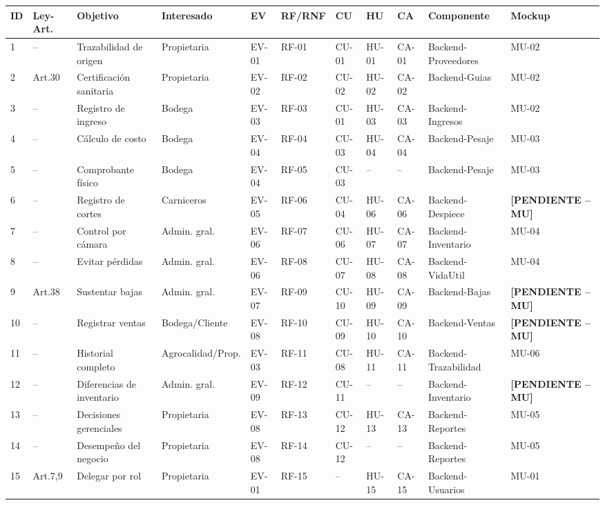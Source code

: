 \documentclass[11pt,a4paper]{article}
\newcommand{\PENDIENTE}[1]{\textcolor{pendiente}{\textbf{[PENDIENTE -- #1]}}}
\begin{document}
\footnotesize
\begin{longtable}{|p{0.6cm}|p{1.6cm}|p{2.3cm}|p{1.7cm}|p{0.9cm}|p{0.9cm}|p{0.9cm}|p{0.9cm}|p{0.9cm}|p{1.5cm}|p{1.1cm}|}
\hline
\textbf{ID} & \textbf{Ley-Art.} & \textbf{Objetivo} & \textbf{Interesado} & \textbf{EV} & \textbf{RF/RNF} & \textbf{CU} & \textbf{HU} & \textbf{CA} & \textbf{Componente} & \textbf{Mockup} \\
\hline
1 & -- & Trazabilidad de origen & Propietaria & EV-01 & RF-01 & CU-01 & HU-01 & CA-01 & Backend-Proveedores & MU-02 \\
2 & Art.30 & Certificación sanitaria & Propietaria & EV-02 & RF-02 & CU-02 & HU-02 & CA-02 & Backend-Guias & MU-02 \\
3 & -- & Registro de ingreso & Bodega & EV-03 & RF-03 & CU-01 & HU-03 & CA-03 & Backend-Ingresos & MU-02 \\
4 & -- & Cálculo de costo & Bodega & EV-04 & RF-04 & CU-03 & HU-04 & CA-04 & Backend-Pesaje & MU-03 \\
5 & -- & Comprobante físico & Bodega & EV-04 & RF-05 & CU-03 & -- & -- & Backend-Pesaje & MU-03 \\
6 & -- & Registro de cortes & Carniceros & EV-05 & RF-06 & CU-04 & HU-06 & CA-06 & Backend-Despiece & \PENDIENTE{MU} \\
7 & -- & Control por cámara & Admin. gral. & EV-06 & RF-07 & CU-06 & HU-07 & CA-07 & Backend-Inventario & MU-04 \\
8 & -- & Evitar pérdidas & Admin. gral. & EV-06 & RF-08 & CU-07 & HU-08 & CA-08 & Backend-VidaUtil & MU-04 \\
9 & Art.38 & Sustentar bajas & Admin. gral. & EV-07 & RF-09 & CU-10 & HU-09 & CA-09 & Backend-Bajas & \PENDIENTE{MU} \\
10 & -- & Registrar ventas & Bodega/Cliente & EV-08 & RF-10 & CU-09 & HU-10 & CA-10 & Backend-Ventas & \PENDIENTE{MU} \\
11 & -- & Historial completo & Agrocalidad/Prop. & EV-03 & RF-11 & CU-08 & HU-11 & CA-11 & Backend-Trazabilidad & MU-06 \\
12 & -- & Diferencias de inventario & Admin. gral. & EV-09 & RF-12 & CU-11 & -- & -- & Backend-Inventario & \PENDIENTE{MU} \\
13 & -- & Decisiones gerenciales & Propietaria & EV-08 & RF-13 & CU-12 & HU-13 & CA-13 & Backend-Reportes & MU-05 \\
14 & -- & Desempeño del negocio & Propietaria & EV-08 & RF-14 & CU-12 & -- & -- & Backend-Reportes & MU-05 \\
15 & Art.7,9 & Delegar por rol & Propietaria & EV-01 & RF-15 & -- & HU-15 & CA-15 & Backend-Usuarios & MU-01 \\

\end{longtable}
\end{document}
